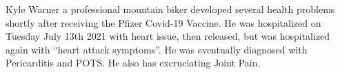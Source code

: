 Kyle Warner a professional mountain biker developed several health problems
shortly after receiving the Pfizer Covid-19 Vaccine. He was hospitalized on
Tuesday July 13th 2021 with heart issue, then released, but was hospitalized
again with “heart attack symptoms”. He was eventually diagnosed with
Pericarditis and POTS. He also has excruciating Joint Pain.
